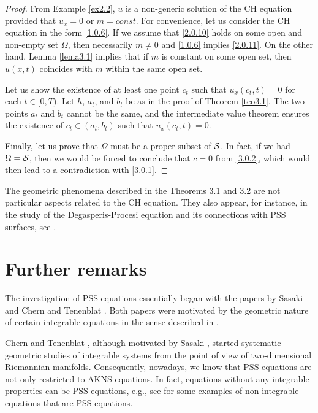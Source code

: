 \documentclass{cimart}
\begin{document}
\begin{proof}
    From Example \ref{ex2.2}, $u$ is a non-generic solution of the CH equation provided that $u_x=0$ or $m=const.$ For convenience, let us consider the CH equation in the form \eqref{1.0.6}. If we assume that \eqref{2.0.10} holds on some open and non-empty set $\Omega$, then necessarily $m\neq0$ and \eqref{1.0.6} implies \eqref{2.0.11}. On the other hand, Lemma \ref{lema3.1} implies that if $m$ is constant on some open set, then $u(x,t)$ coincides with $m$ within the same open set.

    Let us show the existence of at least one point $c_t$ such that $u_x(c_t,t)=0$ for each $t\in[0,T)$. Let $h$, $a_t$, and $b_t$ be as in the proof of Theorem \ref{teo3.1}. The two points $a_t$ and $b_t$ cannot be the same, and the intermediate value theorem ensures the existence of $c_t\in(a_t,b_t)$ such that $u_x(c_t,t)=0$.

    Finally, let us prove that $\Omega$ must be a proper subset of ${\cal S}$. In fact, if we had $\Omega={\cal S}$, then we would be forced to conclude that $c=0$ from \eqref{3.0.2}, which would then lead to a contradiction with \eqref{3.0.1}.
\end{proof}

The geometric phenomena described in the Theorems 3.1 and 3.2 are not particular aspects related to the CH equation. They also appear, for instance, in the study of the Degasperis-Procesi equation and its connections with PSS surfaces, see \cite{freire-dp}. 

\section{Further remarks}

\begin{remark}
The investigation of PSS equations essentially began with the papers by Sasaki \cite{sasaki} and Chern and Tenenblat \cite{chern}. Both papers were motivated by the geometric nature of certain integrable equations in the sense described in \cite{akns}.  
\end{remark}

\begin{remark}
Chern and Tenenblat \cite{chern}, although motivated by Sasaki \cite{sasaki}, started systematic geometric studies of integrable systems from the point of view of two-dimensional Riemannian manifolds. Consequently, nowadays, we know that PSS equations are not only restricted to AKNS equations. In fact, equations without any integrable properties can be PSS equations, e.g., see \cite{keti2015} for some examples of non-integrable equations that are PSS equations. 
\end{remark}
\end{document}
